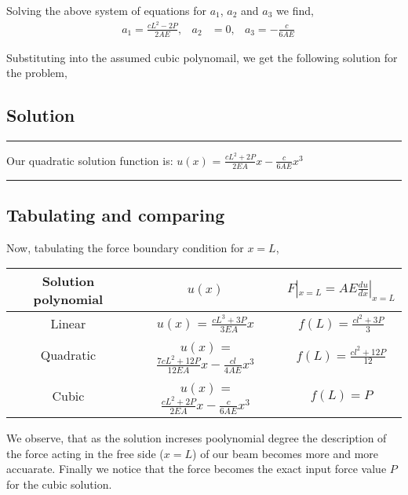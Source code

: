 \documentclass[a4paper]{memoir}
\begin{document}
Solving the above system of equations for $a_1$, $a_2$ and $a_3$ we find,
\begin{align*}
	&a_1 = \frac{cL^2-2P}{2AE}, &a_2 &= 0, &a_3 = -\frac{c}{6AE}
\end{align*}

Substituting into the assumed cubic polynomail, we get the following solution for the problem,

\subsection{Solution}
\begin{minipage}{300pt}
	\begin{center}{
		\begin{shaded}
			\hrule
			\vspace{20pt}
			Our quadratic solution function is: $u(x)$ = $\frac{cL^2+2P}{2EA}x-\frac{c}{6AE}x^3$ %
			\vspace{16pt}
			\hrule
		\end{shaded}
	}
	\end{center}
\end{minipage}

\subsection{Tabulating and comparing}
Now, tabulating the force boundary condition for $x=L$,

\begin{center}
	\begin{tabular*}{0.98\textwidth}{|c|c|c|}
	\hline
		Solution polynomial & $u(x)$ & $F|_{x=L} = AE\frac{du}{dx}|_{x=L}$ \\
	\hline
		Linear 		& $u(x)$ = $\frac{cL^3+3P}{3EA}x$	&	 $f(L) = \frac{cl^2 + 3P}{3}$ \\
	\hline
		Quadratic & $u(x)$ = $\frac{7cL^2+12P}{12EA}x-\frac{cl}{4AE}x^3$ &	$f(L) = \frac{cl^2 + 12P}{12}$ \\
	\hline
		Cubic			& $u(x)$ = $\frac{cL^2+2P}{2EA}x-\frac{c}{6AE}x^3$ & $f(L) = P$ \\
	\hline
	\end{tabular*}
\end{center}

We observe, that as the solution increses poolynomial degree the description of the force acting in the free side ($x=L$) of our beam becomes more and more accuarate. Finally we notice that the force becomes the exact input force value $P$ for the cubic solution. 
\end{document}
